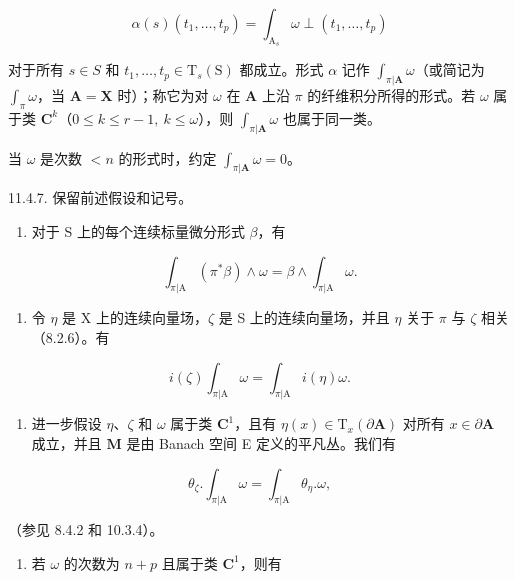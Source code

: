 \[
\alpha (s) \left(t _ {1}, \dots , t _ {p}\right) = \int_ {\mathrm{A} _ {s}} \omega \perp \left(t _ {1}, \dots , t _ {p}\right)
\]

对于所有 \(s \in S\) 和 \(t_{1},\ldots,t_{p}\in\mathrm{T}_{s}(\mathrm{S})\) 都成立。形式 \(\alpha\) 记作 \(\int_{\pi|\mathbf{A}} \omega\)（或简记为 \(\int_{\pi} \omega\)，当 \(\mathbf{A} = \mathbf{X}\) 时）；称它为对 \(\omega\) 在 \(\mathbf{A}\) 上沿 \(\pi\) 的纤维积分所得的形式。若 \(\omega\) 属于类 \(\mathbf{C}^{k}\)（\(0\leqslant k\leqslant r-1,\ k\leqslant\omega\)），则 \(\int_{\pi|\mathbf{A}} \omega\) 也属于同一类。

当 \(\omega\) 是次数 \(< n\) 的形式时，约定 \(\int_{\pi|\mathbf{A}} \omega = 0\)。

11.4.7. 保留前述假设和记号。

\begin{enumerate}
\def\labelenumi{\alph{enumi})}
\tightlist
\item
  对于 S 上的每个连续标量微分形式 \(\beta\)，有
\end{enumerate}

\[
\int_ {\pi | \mathrm{A}} (\pi^ {*} \beta) \wedge \omega = \beta \wedge \int_ {\pi | \mathrm{A}} \omega .
\]

\begin{enumerate}
\def\labelenumi{\alph{enumi})}
\setcounter{enumi}{1}
\tightlist
\item
  令 \(\eta\) 是 X 上的连续向量场，\(\zeta\) 是 S 上的连续向量场，并且 \(\eta\) 关于 \(\pi\) 与 \(\zeta\) 相关（8.2.6）。有
\end{enumerate}

\[
i (\zeta) \int_ {\pi | \mathrm{A}} \omega = \int_ {\pi | \mathrm{A}} i (\eta) \omega .
\]

\begin{enumerate}
\def\labelenumi{\alph{enumi})}
\setcounter{enumi}{2}
\tightlist
\item
  进一步假设 \(\eta\)、\(\zeta\) 和 \(\omega\) 属于类 \(\mathbf{C}^1\)，且有 \(\eta(x) \in \mathrm{T}_x(\partial \mathbf{A})\) 对所有 \(x \in \partial \mathbf{A}\) 成立，并且 \(\mathbf{M}\) 是由 Banach 空间 E 定义的平凡丛。我们有
\end{enumerate}

\[
\theta_ {\zeta}. \int_ {\pi | \mathrm{A}} \omega = \int_ {\pi | \mathrm{A}} \theta_ {\eta}. \omega ,
\]

（参见 8.4.2 和 10.3.4）。

\begin{enumerate}
\def\labelenumi{\alph{enumi})}
\setcounter{enumi}{3}
\tightlist
\item
  若 \(\omega\) 的次数为 \(n + p\) 且属于类 \(\mathbf{C}^1\)，则有
\end{enumerate}

